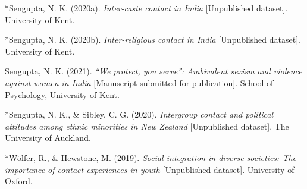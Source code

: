 \documentclass[12pt, letterpaper]{article}
\newenvironment{CSLReferences}[2]{}{}
\begin{document}
\begin{CSLReferences}{1}{0}
\leavevmode\hypertarget{ref-2392}{}%
*Sengupta, N. K. (2020a). \emph{Inter-caste contact in {India}}
{[}Unpublished dataset{]}. University of Kent.

\leavevmode\hypertarget{ref-2385}{}%
*Sengupta, N. K. (2020b). \emph{Inter-religious contact in {India}}
{[}Unpublished dataset{]}. University of Kent.

\leavevmode\hypertarget{ref-sengupta_protect_unpublished}{}%
Sengupta, N. K. (2021). \emph{{``We protect, you serve''}: Ambivalent
sexism and violence against women in {India}} {[}Manuscript submitted
for publication{]}. School of Psychology, University of Kent.

\leavevmode\hypertarget{ref-2381}{}%
*Sengupta, N. K., \& Sibley, C. G. (2020). \emph{Intergroup contact and
political attitudes among ethnic minorities in {New Zealand}}
{[}Unpublished dataset{]}. The University of Auckland.

\leavevmode\hypertarget{ref-2383}{}%
*Wölfer, R., \& Hewstone, M. (2019). \emph{Social integration in diverse
societies: The importance of contact experiences in youth}
{[}Unpublished dataset{]}. University of Oxford.

\end{CSLReferences}

\endgroup
\end{document}
